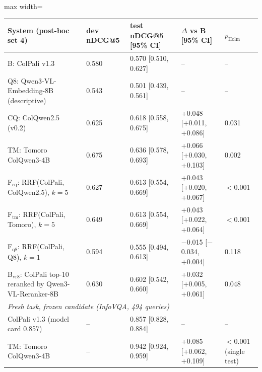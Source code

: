 \begin{adjustbox}{max width=\linewidth}
\begin{tabular}{lllll}
\toprule
System (post-hoc set 4) & dev nDCG@5 & test nDCG@5 [95\% CI] & $\Delta$ vs B [95\% CI] & $p_\mathrm{Holm}$ \\
\midrule
B: ColPali v1.3 & 0.580 & 0.570 [0.510, 0.627] & -- & -- \\
Q8: Qwen3-VL-Embedding-8B (descriptive) & 0.543 & 0.501 [0.439, 0.561] & -- & -- \\
CQ: ColQwen2.5 (v0.2) & 0.625 & 0.618 [0.558, 0.675] & +0.048 [+0.011, +0.086] & 0.031 \\
TM: Tomoro ColQwen3-4B & 0.675 & 0.636 [0.578, 0.693] & +0.066 [+0.030, +0.103] & 0.002 \\
F$_\text{cq}$: RRF(ColPali, ColQwen2.5), $k{=}5$ & 0.627 & 0.613 [0.554, 0.669] & +0.043 [+0.020, +0.067] & $<$0.001 \\
F$_\text{tm}$: RRF(ColPali, Tomoro), $k{=}5$ & 0.649 & 0.613 [0.554, 0.669] & +0.043 [+0.022, +0.064] & $<$0.001 \\
F$_\text{q8}$: RRF(ColPali, Q8), $k{=}1$ & 0.594 & 0.555 [0.494, 0.613] & $-$0.015 [$-$0.034, +0.004] & 0.118 \\
B$_\text{vr8}$: ColPali top-10 reranked by Qwen3-VL-Reranker-8B & 0.630 & 0.602 [0.542, 0.660] & +0.032 [+0.005, +0.061] & 0.048 \\
\midrule \multicolumn{5}{l}{\emph{Fresh task, frozen candidate (InfoVQA, 494 queries)}} \\ ColPali v1.3 (model card 0.857) & -- & 0.857 [0.828, 0.884] & -- & -- \\
TM: Tomoro ColQwen3-4B & -- & 0.942 [0.924, 0.959] & +0.085 [+0.062, +0.109] & $<$0.001 (single test) \\
\bottomrule
\end{tabular}
\end{adjustbox}
\par{}
